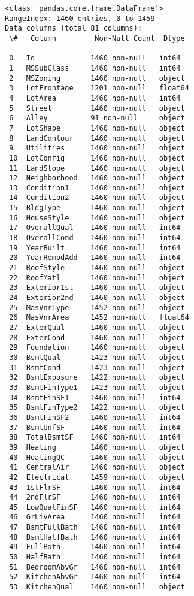 \documentclass[11pt]{article}
\begin{document}
    \begin{Verbatim}[commandchars=\\\{\}]
<class 'pandas.core.frame.DataFrame'>
RangeIndex: 1460 entries, 0 to 1459
Data columns (total 81 columns):
 \#   Column         Non-Null Count  Dtype
---  ------         --------------  -----
 0   Id             1460 non-null   int64
 1   MSSubClass     1460 non-null   int64
 2   MSZoning       1460 non-null   object
 3   LotFrontage    1201 non-null   float64
 4   LotArea        1460 non-null   int64
 5   Street         1460 non-null   object
 6   Alley          91 non-null     object
 7   LotShape       1460 non-null   object
 8   LandContour    1460 non-null   object
 9   Utilities      1460 non-null   object
 10  LotConfig      1460 non-null   object
 11  LandSlope      1460 non-null   object
 12  Neighborhood   1460 non-null   object
 13  Condition1     1460 non-null   object
 14  Condition2     1460 non-null   object
 15  BldgType       1460 non-null   object
 16  HouseStyle     1460 non-null   object
 17  OverallQual    1460 non-null   int64
 18  OverallCond    1460 non-null   int64
 19  YearBuilt      1460 non-null   int64
 20  YearRemodAdd   1460 non-null   int64
 21  RoofStyle      1460 non-null   object
 22  RoofMatl       1460 non-null   object
 23  Exterior1st    1460 non-null   object
 24  Exterior2nd    1460 non-null   object
 25  MasVnrType     1452 non-null   object
 26  MasVnrArea     1452 non-null   float64
 27  ExterQual      1460 non-null   object
 28  ExterCond      1460 non-null   object
 29  Foundation     1460 non-null   object
 30  BsmtQual       1423 non-null   object
 31  BsmtCond       1423 non-null   object
 32  BsmtExposure   1422 non-null   object
 33  BsmtFinType1   1423 non-null   object
 34  BsmtFinSF1     1460 non-null   int64
 35  BsmtFinType2   1422 non-null   object
 36  BsmtFinSF2     1460 non-null   int64
 37  BsmtUnfSF      1460 non-null   int64
 38  TotalBsmtSF    1460 non-null   int64
 39  Heating        1460 non-null   object
 40  HeatingQC      1460 non-null   object
 41  CentralAir     1460 non-null   object
 42  Electrical     1459 non-null   object
 43  1stFlrSF       1460 non-null   int64
 44  2ndFlrSF       1460 non-null   int64
 45  LowQualFinSF   1460 non-null   int64
 46  GrLivArea      1460 non-null   int64
 47  BsmtFullBath   1460 non-null   int64
 48  BsmtHalfBath   1460 non-null   int64
 49  FullBath       1460 non-null   int64
 50  HalfBath       1460 non-null   int64
 51  BedroomAbvGr   1460 non-null   int64
 52  KitchenAbvGr   1460 non-null   int64
 53  KitchenQual    1460 non-null   object

\end{Verbatim}
\end{document}
